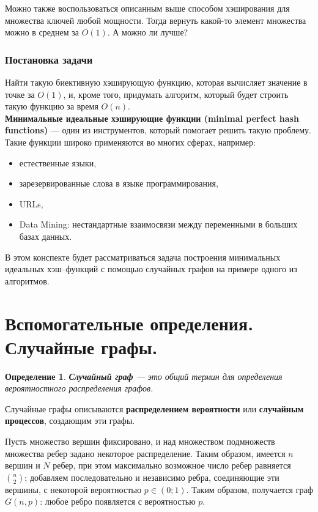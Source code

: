 \documentclass[specialist,
               substylefile = spbu.rtx,
               subf,href,colorlinks=true, 12pt]{disser}
\newtheorem{mydef}{Определение}
\begin{document}
Можно также воспользоваться описанным выше способом хэширования для множества ключей любой мощности. Тогда вернуть какой-то элемент множества можно в среднем за $\mathit{O}(1)$. А можно ли лучше?

\subsubsection{Постановка задачи}

Найти такую биективную хэширующую функцию, которая вычисляет значение в точке за $\mathit{O}(1)$, и, кроме того, придумать алгоритм, который будет строить такую функцию за время $\mathit{O}(n)$.
\\

\textbf{Минимальные идеальные хэширующие функции (minimal perfect hash functions)} --- один из инструментов, который помогает решить такую проблему. Такие функции широко применяются во многих сферах, например:

\begin{itemize}
\item естественные языки,
\item зарезервированные слова в языке программирования,
\item URLs,
\item Data Mining: нестандартные взаимосвязи между переменными в больших базах данных.
\end{itemize}

В этом конспекте будет рассматриваться задача построения минимальных идеальных хэш--функций с помощью случайных графов на примере одного из алгоритмов.

\newpage

\section{Вспомогательные определения. Случайные графы.}

\begin{mydef}
\textbf{Случайный граф} --- это общий термин для определения вероятностного распределения графов.
\end{mydef}

Случайные графы описываются \textbf{распределением вероятности} или \textbf{случайным процессов}, создающим эти графы.

Пусть множество вершин фиксировано, и над множеством подмножеств множества ребер задано некоторое распределение. Таким образом, имеется $n$ вершин и  $N$ ребер, при этом максимально возможное число ребер равняется $\binom{n}{2}$; добавляем последовательно и независимо ребра, соединяющие эти вершины, с некоторой вероятностью $p \in (0;1)$. Таким образом, получается граф $G(n,p)$: любое ребро появляется с вероятностью $p$.
\end{document}
